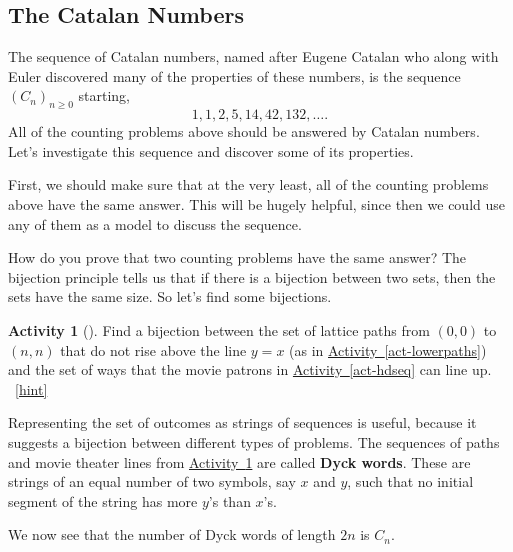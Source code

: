 \documentclass[10pt,]{book}
\newcommand{\terminology}[1]{\textbf{#1}}
\theoremstyle{plain}
\theoremstyle{definition}
\theoremstyle{definition}
\theoremstyle{definition}
\newtheorem{activity}[project]{Activity}
\numberwithin{equation}{chapter}
\begin{document}
\subsection[{The Catalan Numbers}]{The Catalan Numbers}\label{subsec-catalanseq}
\hypertarget{p-575}{}%
The sequence of Catalan numbers, named after Eugene Catalan who along with Euler discovered many of the properties of these numbers, is the sequence \((C_n)_{n \ge 0}\) starting,%
\begin{equation*}
1, 1, 2, 5, 14, 42, 132, \ldots\text{.}
\end{equation*}
All of the counting problems above should be answered by Catalan numbers.  Let's investigate this sequence and discover some of its properties.%
\par
\hypertarget{p-576}{}%
First, we should make sure that at the very least, all of the counting problems above have the same answer.  This will be hugely helpful, since then we could use any of them as a model to discuss the sequence.%
\par
\hypertarget{p-577}{}%
How do you prove that two counting problems have the same answer?  The bijection principle tells us that if there is a bijection between two sets, then the sets have the same size.  So let's find some bijections.%
\begin{activity}[]\label{act-pathshdseq}
\hypertarget{p-578}{}%
Find a bijection between the set of lattice paths from \((0,0)\) to \((n,n)\) that do not rise above the line \(y = x\) (as in \hyperref[act-lowerpaths]{Activity~\ref{act-lowerpaths}}) and the set of ways that the movie patrons in \hyperref[act-hdseq]{Activity~\ref{act-hdseq}} can line up.%
~\hfill{\tiny\hyperlink{a-116}{[hint]}\hypertarget{q-116}{}}\end{activity}
\hypertarget{p-580}{}%
Representing the set of outcomes as strings of sequences is useful, because it suggests a bijection between different types of problems.  The sequences of paths and movie theater lines from \hyperref[act-pathshdseq]{Activity~\ref{act-pathshdseq}} are called \terminology{Dyck words}.  These are strings of an equal number of two symbols, say \(x\) and \(y\), such that no initial segment of the string has more \(y\)'s than \(x\)'s.%
\par
\hypertarget{p-581}{}%
We now see that the number of Dyck words of length \(2n\) is \(C_n\).%
\end{document}
